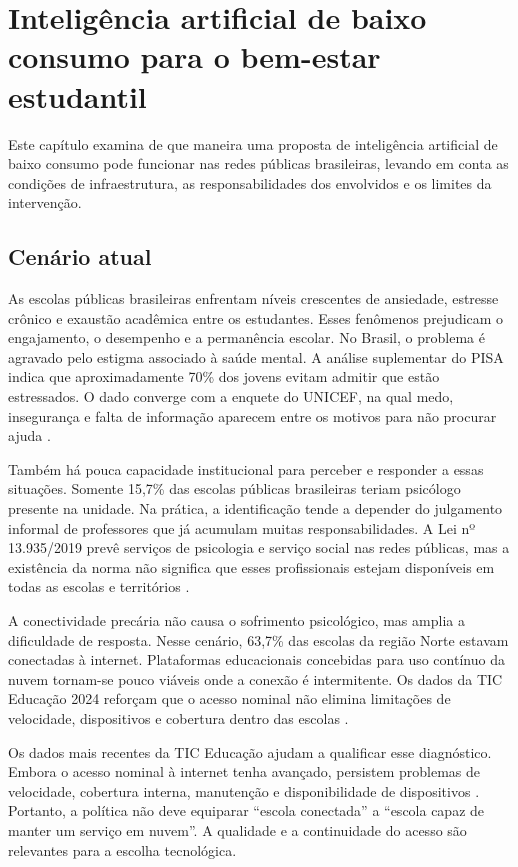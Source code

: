 \chapter{Inteligência artificial de baixo consumo para o bem-estar estudantil}

Este capítulo examina de que maneira uma proposta de inteligência artificial de
baixo consumo pode funcionar nas redes públicas brasileiras, levando em
conta as condições de infraestrutura, as responsabilidades dos envolvidos e os
limites da intervenção.

\section{Cenário atual}

As escolas públicas brasileiras enfrentam níveis crescentes de ansiedade,
estresse crônico e exaustão acadêmica entre os estudantes. Esses fenômenos
prejudicam o engajamento, o desempenho e a permanência escolar. No Brasil, o problema é agravado pelo estigma associado à saúde mental. A
análise suplementar do PISA indica que aproximadamente
70\% dos jovens evitam admitir que estão estressados. O dado converge com a
enquete do UNICEF, na qual medo, insegurança e falta de informação aparecem
entre os motivos para não procurar ajuda \cite{unicef2022ajuda}.

Também há pouca capacidade institucional para perceber e responder a essas
situações. Somente 15,7\% das escolas públicas
brasileiras teriam psicólogo presente na unidade. Na prática, a identificação
tende a depender do julgamento informal de professores que já acumulam muitas
responsabilidades. A Lei nº 13.935/2019 prevê serviços de psicologia e serviço
social nas redes públicas, mas a existência da norma não significa que esses
profissionais estejam disponíveis em todas as escolas e territórios
\cite{brasil13935}.

A conectividade precária não causa o sofrimento psicológico, mas amplia a
dificuldade de resposta. Nesse cenário, 63,7\% das
escolas da região Norte estavam conectadas à internet. Plataformas educacionais
concebidas para uso contínuo da nuvem tornam-se pouco viáveis onde a conexão é
intermitente. Os dados da TIC Educação 2024 reforçam que o acesso nominal não
elimina limitações de velocidade, dispositivos e cobertura dentro das escolas
\cite{cgi2025}.

Os dados mais recentes da TIC Educação ajudam a qualificar esse diagnóstico.
Embora o acesso nominal à internet tenha avançado, persistem problemas de
velocidade, cobertura interna, manutenção e disponibilidade de dispositivos
\cite{cgi2025}. Portanto, a política não deve equiparar ``escola conectada'' a
``escola capaz de manter um serviço em nuvem''. A qualidade e a continuidade do
acesso são relevantes para a escolha tecnológica.

